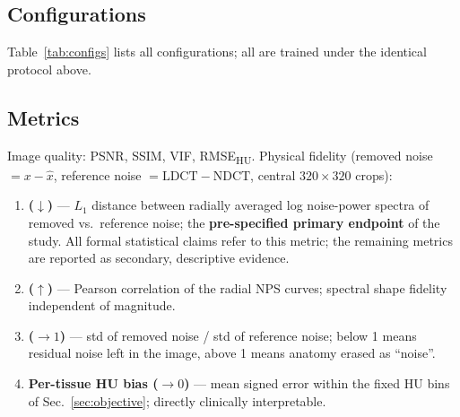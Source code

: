 \subsection{Configurations}
\label{sec:configs}

Table~\ref{tab:configs} lists all configurations; all are trained under the identical protocol above.

\begin{table}[!tbp]
\centering
\caption{Configurations. ``frz-DC 2'' = two near-DC knots frozen at $G{=}1$; ``cent.'' = batch-centering penalty (weight 0.05).}
\label{tab:configs}
\setlength{\tabcolsep}{3pt}
\end{table}

\subsection{Metrics}
\label{sec:metrics}

Image quality: PSNR, SSIM, VIF, RMSE\textsubscript{HU}. Physical fidelity (removed noise $= x - \hat{x}$, reference noise $= \mathrm{LDCT} - \mathrm{NDCT}$, central $320 \times 320$ crops):

\begin{enumerate}
  \item \textbf{\npsl{} ($\downarrow$)} --- $L_1$ distance between radially averaged log noise-power spectra of removed vs.\ reference noise; the \textbf{pre-specified primary endpoint} of the study. All formal statistical claims refer to this metric; the remaining metrics are reported as secondary, descriptive evidence.
  \item \textbf{\npsc{} ($\uparrow$)} --- Pearson correlation of the radial NPS curves; spectral shape fidelity independent of magnitude.
  \item \textbf{\stdr{} ($\rightarrow 1$)} --- std of removed noise / std of reference noise; below 1 means residual noise left in the image, above 1 means anatomy erased as ``noise''.
  \item \textbf{Per-tissue HU bias ($\rightarrow 0$\hu{})} --- mean signed error within the fixed HU bins of Sec.~\ref{sec:objective}; directly clinically interpretable.
\end{enumerate}

